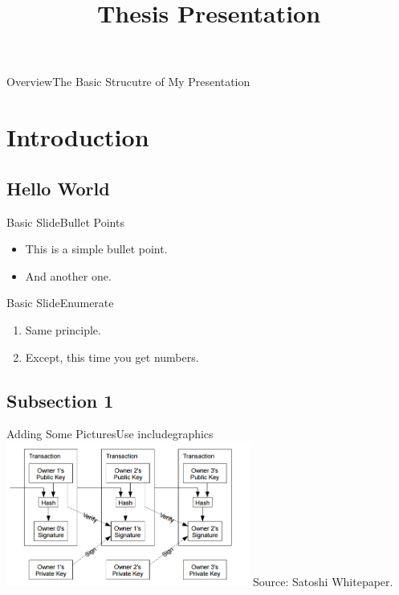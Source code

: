 \documentclass{beamer}
\title{Thesis Presentation}
\begin{document}
  \begin{frame}[plain]
    \titlepage
  \end{frame}
  
\begin{frame}{Overview}{The Basic Strucutre of My Presentation}
  \tableofcontents
\end{frame}

\section{Introduction}

\subsection{Hello World}

\begin{frame}{Basic Slide}{Bullet Points}
  \begin{itemize}
    \item<1->{This is a simple bullet point.}
    \item<2->{And another one.}
  \end{itemize}
  \vspace{1em}
\end{frame}

\begin{frame}{Basic Slide}{Enumerate}
  \begin{enumerate}
    \item<1->{Same principle.}
    \item<2->{Except, this time you get numbers.}
  \end{enumerate}
  \vspace{1em}
\end{frame}

\subsection{Subsection 1}

\begin{frame}{Adding Some Pictures}{Use includegraphics}
  \center\includegraphics[width = 8cm, frame]{../assetlib/images/chain.png}
  \vfill
  \scriptsize Source:\hspace{1em} Satoshi Whitepaper.
\end{frame}
\end{document}
